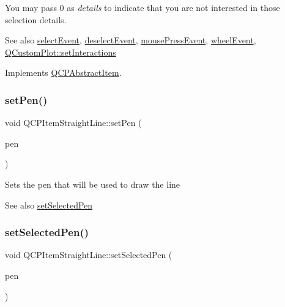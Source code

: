 You may pass 0 as {\itshape details} to indicate that you are not interested in those selection details.

\begin{DoxySeeAlso}{See also}
\mbox{\hyperlink{class_q_c_p_abstract_item_aa4b969c58797f39c9c0b6c07c7869d17}{select\+Event}}, \mbox{\hyperlink{class_q_c_p_abstract_item_af9093798cb07a861dcc73f93ca16c0c1}{deselect\+Event}}, \mbox{\hyperlink{class_q_c_p_layerable_af6567604818db90f4fd52822f8bc8376}{mouse\+Press\+Event}}, \mbox{\hyperlink{class_q_c_p_layerable_a47dfd7b8fd99c08ca54e09c362b6f022}{wheel\+Event}}, \mbox{\hyperlink{class_q_custom_plot_a5ee1e2f6ae27419deca53e75907c27e5}{Q\+Custom\+Plot\+::set\+Interactions}} 
\end{DoxySeeAlso}


Implements \mbox{\hyperlink{class_q_c_p_abstract_item_ae41d0349d68bb802c49104afd100ba2a}{Q\+C\+P\+Abstract\+Item}}.

\mbox{\label{class_q_c_p_item_straight_line_a9f36c9c9e60d7d9ac084c80380ac8601}} 
\subsubsection{\texorpdfstring{setPen()}{setPen()}}
{\footnotesize\ttfamily void Q\+C\+P\+Item\+Straight\+Line\+::set\+Pen (\begin{DoxyParamCaption}\item[{const Q\+Pen \&}]{pen }\end{DoxyParamCaption})}

Sets the pen that will be used to draw the line

\begin{DoxySeeAlso}{See also}
\mbox{\hyperlink{class_q_c_p_item_straight_line_a5c33559498d33543fa95cf0a36e851ff}{set\+Selected\+Pen}} 
\end{DoxySeeAlso}
\mbox{\label{class_q_c_p_item_straight_line_a5c33559498d33543fa95cf0a36e851ff}} 
\subsubsection{\texorpdfstring{setSelectedPen()}{setSelectedPen()}}
{\footnotesize\ttfamily void Q\+C\+P\+Item\+Straight\+Line\+::set\+Selected\+Pen (\begin{DoxyParamCaption}\item[{const Q\+Pen \&}]{pen }\end{DoxyParamCaption})}

